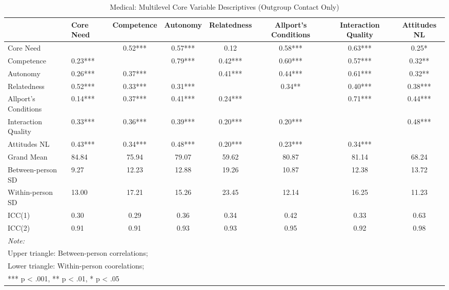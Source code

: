 
\begin{landscape}\begin{table}
\begin{minipage}[t][\textheight][t]{\textwidth}

\caption{Medical: Multilevel Core Variable Descriptives (Outgroup Contact Only)}
\centering
\begin{tabular}[t]{llcccccc}
\toprule
  & Core Need & Competence & Autonomy & Relatedness & Allport's Conditions & Interaction Quality & Attitudes NL\\
\midrule
Core Need &  & 0.52*** & 0.57*** & 0.12 & 0.58*** & 0.63*** & 0.25*\\
Competence & 0.23*** &  & 0.79*** & 0.42*** & 0.60*** & 0.57*** & 0.32**\\
Autonomy & 0.26*** & 0.37*** &  & 0.41*** & 0.44*** & 0.61*** & 0.32**\\
Relatedness & 0.52*** & 0.33*** & 0.31*** &  & 0.34** & 0.40*** & 0.38***\\
Allport's Conditions & 0.14*** & 0.37*** & 0.41*** & 0.24*** &  & 0.71*** & 0.44***\\
Interaction Quality & 0.33*** & 0.36*** & 0.39*** & 0.20*** & 0.20*** &  & 0.48***\\
Attitudes NL & 0.43*** & 0.34*** & 0.48*** & 0.20*** & 0.23*** & 0.34*** & \\
\addlinespace
Grand Mean & 84.84 & 75.94 & 79.07 & 59.62 & 80.87 & 81.14 & 68.24\\
Between-person SD & 9.27 & 12.23 & 12.88 & 19.26 & 10.87 & 12.38 & 13.72\\
Within-person SD & 13.00 & 17.21 & 15.26 & 23.45 & 12.14 & 16.25 & 11.23\\
ICC(1) & 0.30 & 0.29 & 0.36 & 0.34 & 0.42 & 0.33 & 0.63\\
ICC(2) & 0.91 & 0.91 & 0.93 & 0.93 & 0.95 & 0.92 & 0.98\\
\bottomrule
\multicolumn{8}{l}{\rule{0pt}{1em}\textit{Note: }}\\
\multicolumn{8}{l}{\rule{0pt}{1em}Upper triangle: Between-person correlations;}\\
\multicolumn{8}{l}{\rule{0pt}{1em}Lower triangle: Within-person coorelations;}\\
\multicolumn{8}{l}{\rule{0pt}{1em}*** p < .001, ** p < .01,  * p < .05}\\
\end{tabular}
\end{minipage}
\end{table}
\end{landscape}
